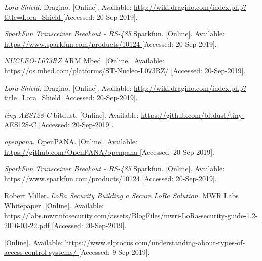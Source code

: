 \begin{thebibliography}{9}
\textit{
Lora Shield.
}
Dragino.
[Online]. Available:
\url{
http://wiki.dragino.com/index.php?title=Lora_Shield
}
[Accessed: 20-Sep-2019].



\textit{
SparkFun Transceiver Breakout - RS-485
}
Sparkfun.
[Online]. Available:
\url{
https://www.sparkfun.com/products/10124
}
[Accessed: 20-Sep-2019].



\textit{
NUCLEO-L073RZ
}
ARM Mbed.
[Online]. Available:
\url{
https://os.mbed.com/platforms/ST-Nucleo-L073RZ/
}
[Accessed: 20-Sep-2019].



\textit{
Lora Shield.
}
Dragino.
[Online]. Available:
\url{
http://wiki.dragino.com/index.php?title=Lora_Shield
}
[Accessed: 20-Sep-2019].



\textit{
tiny-AES128-C
}
bitdust.
[Online]. Available:
\url{
https://github.com/bitdust/tiny-AES128-C
}
[Accessed: 20-Sep-2019].



\textit{
openpana.
}
OpenPANA.
[Online]. Available:
\url{
https://github.com/OpenPANA/openpana
}
[Accessed: 20-Sep-2019].



\textit{
SparkFun Transceiver Breakout - RS-485
}
Sparkfun.
[Online]. Available:
\url{
https://www.sparkfun.com/products/10124
}
[Accessed: 20-Sep-2019].



Robert Miller.
\textit{
LoRa Security
Building a Secure LoRa Solution.
}
MWR Labs Whitepaper.
[Online]. Available:
\url{
https://labs.mwrinfosecurity.com/assets/BlogFiles/mwri-LoRa-security-guide-1.2-2016-03-22.pdf
}
[Accessed: 20-Sep-2019].






[Online]. Available:
\url{
https://www.elprocus.com/understanding-about-types-of-access-control-systems/
}
[Accessed: 9-Sep-2019].




\end{thebibliography}
